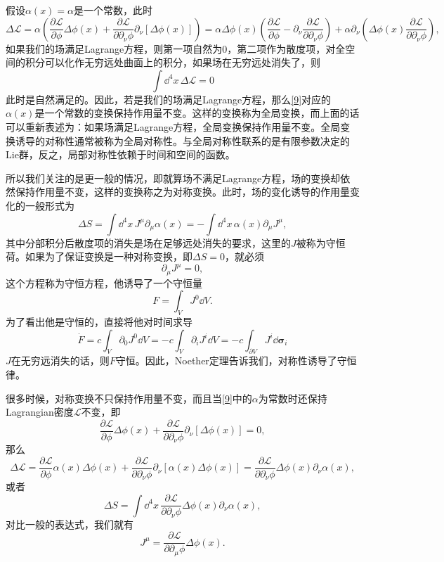 \documentclass[10pt]{book}
\begin{document}
假设$\alpha(x)=\alpha$是一个常数，此时
\[
	\Delta\mathcal{L}=\alpha\left(\frac{\partial \mathcal{L}}{\partial \phi}\Delta\phi(x)+\frac{\partial \mathcal{L}}{\partial \partial_\nu\phi}\partial_\nu[\Delta\phi(x)]\right)=\alpha\Delta\phi(x)\left(\frac{\partial \mathcal{L}}{\partial \phi}-\partial_\nu\frac{\partial \mathcal{L}}{\partial \partial_\nu\phi}\right)+\alpha\partial_\nu\left(\Delta\phi(x)\frac{\partial \mathcal{L}}{\partial \partial_\nu\phi}\right),
\]
如果我们的场满足Lagrange方程，则第一项自然为$0$，第二项作为散度项，对全空间的积分可以化作无穷远处曲面上的积分，如果场在无穷远处消失了，则
\[
	\int\dd^4x\,\Delta\mathcal{L}=0
\]
此时是自然满足的。因此，若是我们的场满足Lagrange方程，那么\eqref{9}对应的$\alpha(x)$是一个常数的变换保持作用量不变。这样的变换称为全局变换，而上面的话可以重新表述为：如果场满足Lagrange方程，全局变换保持作用量不变。全局变换诱导的对称性通常被称为全局对称性。与全局对称性联系的是有限参数决定的Lie群，反之，局部对称性依赖于时间和空间的函数。

所以我们关注的是更一般的情况，即就算场不满足Lagrange方程，场的变换却依然保持作用量不变，这样的变换称之为对称变换。此时，场的变化诱导的作用量变化的一般形式为
\begin{equation}
	\Delta S=\int\dd^4x\,J^\mu\partial_\mu \alpha(x)=-\int\dd^4x\,\alpha(x)\partial_\mu J^\mu,
	\label{dS}
\end{equation}
其中分部积分后散度项的消失是场在足够远处消失的要求，这里的$J$被称为守恒荷。如果为了保证变换是一种对称变换，即$\Delta S=0$，就必须
\[
	\partial_\mu J^\mu=0,
\]
这个方程称为守恒方程，他诱导了一个守恒量
\[
	F=\int_{V} J^0 \dd V.
\]
为了看出他是守恒的，直接将他对时间求导
\[
	\dot{F}=c\int_{V} \partial_0J^0 \dd V=-c\int_{V} \partial_iJ^i \dd V=-c\int_{\partial V}J^i \dd \bm{\sigma}_i
\]
$J$在无穷远消失的话，则$F$守恒。因此，Noether定理告诉我们，对称性诱导了守恒律。

很多时候，对称变换不只保持作用量不变，而且当\eqref{9}中的$\alpha$为常数时还保持Lagrangian密度$\mathcal{L}$不变，即
\[
	\frac{\partial \mathcal{L}}{\partial \phi}\Delta\phi(x)+\frac{\partial \mathcal{L}}{\partial \partial_\nu\phi}\partial_\nu[\Delta\phi(x)]=0,
\]
那么
\[
	\Delta\mathcal{L}=\frac{\partial \mathcal{L}}{\partial \phi}\alpha(x)\Delta\phi(x)+\frac{\partial \mathcal{L}}{\partial \partial_\nu\phi}\partial_\nu[\alpha(x)\Delta\phi(x)]=\frac{\partial \mathcal{L}}{\partial \partial_\nu\phi}\Delta\phi(x)\partial_\nu\alpha(x),
\]
或者
\[
	\Delta S=\int\dd^4 x\,\frac{\partial \mathcal{L}}{\partial \partial_\nu\phi}\Delta\phi(x)\partial_\nu\alpha(x),
\]
对比一般的表达式，我们就有
\[
	J^\mu=\frac{\partial \mathcal{L}}{\partial \partial_\mu\phi}\Delta\phi(x).
\]
\end{document}
